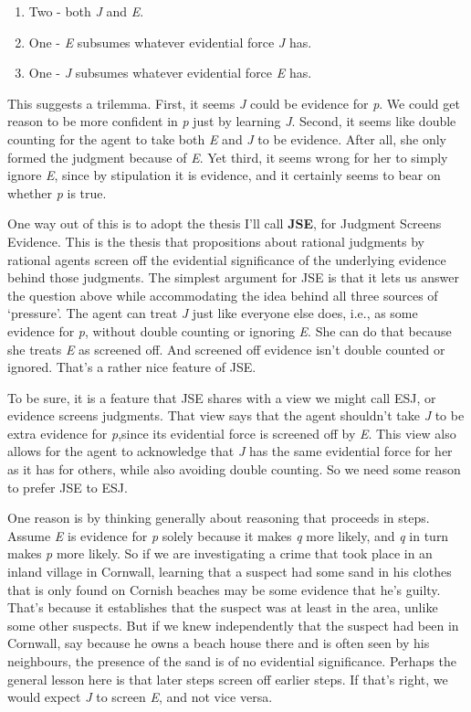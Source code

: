 \begin{enumerate}
\item{} Two - both \emph{J} and \emph{E}.

\item{} One - \emph{E} subsumes whatever evidential force \emph{J} has.

\item{} One - \emph{J} subsumes whatever evidential force \emph{E} has.

\end{enumerate}
This suggests a trilemma. First, it seems \emph{J} could be evidence for \emph{p}. We could get reason to be more confident in \emph{p} just by learning \emph{J}. Second, it seems like double counting for the agent to take both \emph{E} and \emph{J} to be evidence. After all, she only formed the judgment because of \emph{E}. Yet third, it seems wrong for her to simply ignore \emph{E}, since by stipulation it is evidence, and it certainly seems to bear on whether \emph{p} is true.

One way out of this is to adopt the thesis I'll call \textbf{JSE}, for Judgment Screens Evidence. This is the thesis that propositions about rational judgments by rational agents screen off the evidential significance of the underlying evidence behind those judgments. The simplest argument for JSE is that it lets us answer the question above while accommodating the idea behind all three sources of `pressure'. The agent can treat \emph{J} just like everyone else does, i.e., as some evidence for \emph{p}, without double counting or ignoring \emph{E}. She can do that because she treats \emph{E} as screened off. And screened off evidence isn't double counted or ignored. That's a rather nice feature of JSE.

To be sure, it is a feature that JSE shares with a view we might call ESJ, or evidence screens judgments. That view says that the agent shouldn't take \emph{J} to be extra evidence for \emph{p},since its evidential force is screened off by \emph{E}. This view also allows for the agent to acknowledge that \emph{J} has the same evidential force for her as it has for others, while also avoiding double counting. So we need some reason to prefer JSE to ESJ.

One reason is by thinking generally about reasoning that proceeds in steps. Assume \emph{E} is evidence for \emph{p} solely because it makes \emph{q} more likely, and \emph{q} in turn makes \emph{p} more likely. So if we are investigating a crime that took place in an inland village in Cornwall, learning that a suspect had some sand in his clothes that is only found on Cornish beaches may be some evidence that he's guilty. That's because it establishes that the suspect was at least in the area, unlike some other suspects. But if we knew independently that the suspect had been in Cornwall, say because he owns a beach house there and is often seen by his neighbours, the presence of the sand is of no evidential significance. Perhaps the general lesson here is that later steps screen off earlier steps. If that's right, we would expect \emph{J} to screen \emph{E}, and not vice versa.

